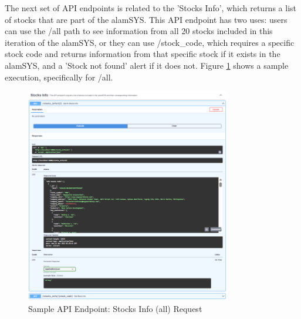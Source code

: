 The next set of API endpoints is related to the 'Stocks Info', which returns a 
list of stocks that are part of the alamSYS. This API endpoint has two uses: 
users can use the /all path to see information from all 20 stocks included 
in this iteration of the alamSYS, or they can use /stock\_code, which 
requires a specific stock code and returns information from that specific 
stock if it exists in the alamSYS, and a 'Stock not found' alert if it does not.
Figure \ref{fig:alamAPI_info} shows a sample execution, specifically for /all.
\begin{figure}[ht]
    \centering
    \includegraphics[width=0.80\textwidth]{./assets/Chapter_4/Documentation/alamAPI_info.png}
    \caption{Sample API Endpoint: Stocks Info (all) Request}
    \label{fig:alamAPI_info}
\end{figure}
\FloatBarrier

